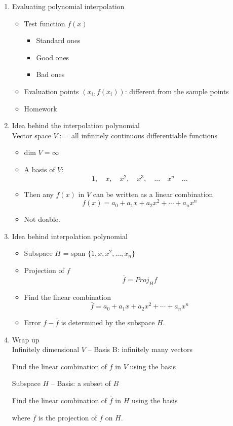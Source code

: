 \documentclass{article}
\theoremstyle{remark}
\begin{document}
\begin{enumerate}
\item Evaluating polynomial interpolation
\begin{itemize}
\item Test function $f(x)$
\begin{itemize}
\item Standard ones
\item Good ones
\item Bad ones
\end{itemize}
\item Evaluation points $(x_i,f(x_i))$: different from the sample points
\item Homework
\end{itemize}

\item Idea behind the interpolation polynomial \\
Vector space $V:=$ all infinitely continuous differentiable functions
\begin{itemize}
\item dim $V = \infty$ 
\item A basis of $V$:
$$
1,\quad x, \quad  x^2, \quad x^3, \quad ...\quad x^n\quad ...
$$
\item Then any $f(x)$ in $V$ can be written as a linear combination 
$$
f(x) = a_0+a_1x+a_2x^2+\cdots + a_nx^n
$$
\item Not doable.
\end{itemize}


\item Idea behind interpolation polynomial
\begin{itemize}
\item Subspace $H$ = span $\{1,x,x^2,...,x_n\}$
\item Projection of $f$
$$
\bar f = Proj_{H}f
$$
\item Find the linear combination 
$$
\bar f = a_0 + a_1x+ a_2x^2+ \cdots + a_nx^n
$$
\item Error $f-\bar f$ is determined by the subspace $H$.
\end{itemize}

\item Wrap up \\
Infinitely dimensional $V$  -- Basis B: infinitely many vectors
\begin{center}
Find the linear combination of $f$ in $V$ using the basis
\end{center}
Subspace $H$  -- Basis: a subset of $B$
\begin{center}
Find the linear combination of $\bar f$ in $H$ using the basis
\end{center}
where $\bar f$ is the projection of $f$ on $H$.


\end{enumerate}
\end{document}
